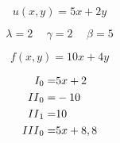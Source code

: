 \documentclass[12pt,a4paper]{article}
\newcommand{\romannumeralcaps}[1]{\MakeUppercase{\romannumeral #1}}
\begin{document}
    \thispagestyle{empty}

    \Large

    \[ u(x,y) = 5x + 2y \]

    \[
    \lambda = 2 \hspace{15pt}
    \gamma  = 2 \hspace{15pt}
    \beta   = 5
    \]

    \[ f(x,y) = 10x + 4y \]

    \begin{eqnarray*}
        \romannumeralcaps{1}_0 = & 5x + 2  \\
        \romannumeralcaps{2}_0 = & -10     \\
        \romannumeralcaps{2}_1 = & 10      \\
        \romannumeralcaps{3}_0 = & 5x + 8,8
    \end{eqnarray*}
\end{document}
